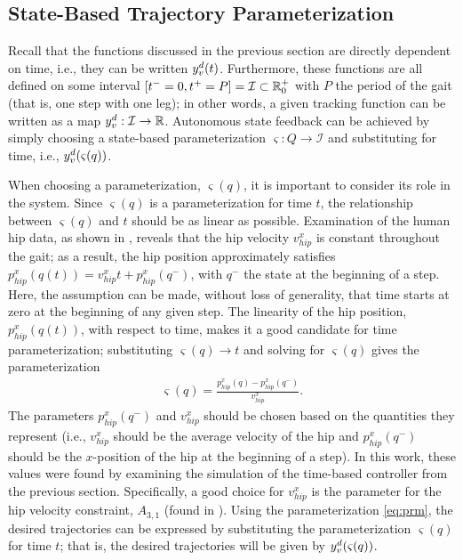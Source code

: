 \subsection{State-Based Trajectory Parameterization}

Recall that the functions discussed in the previous section are directly
dependent on time, i.e., they can be written $y_{v}^{d}(t)$.
%
Furthermore, these functions are all defined on some interval $[t^- = 0, t^+ =
P] = \mathcal{I} \subset \mathbb{R}_{0}^{+}$ with $P$ the period of the gait (that is,
one step with one leg);
%
in other words, a given tracking function can be written as a map $y_{v}^{d} :
\mathcal{I} \to \mathbb{R}$.
%
Autonomous state feedback can be achieved by simply choosing a state-based
parameterization $\varsigma : Q \to \mathcal{I}$ and substituting for time,
i.e., $y_{v}^{d}(\varsigma(q))$.

When choosing a parameterization, $\varsigma(q)$, it is important to consider
its role in the system.
%
Since $\varsigma(q)$ is a parameterization for time $t$, the relationship
between $\varsigma(q)$ and $t$ should be as linear as possible.
%
Examination of the human hip data, as shown in , reveals
that the hip velocity $v_{\mathit{hip}}^{x}$ is constant throughout the gait;
%
as a result, the hip position approximately satisfies
$p_{\mathit{hip}}^{x}(q(t)) = v_{\mathit{hip}}^x t + p_\mathit{hip}^x(q^-)$,
with $q^-$ the state at the beginning of a step.
%
Here, the assumption can be made, without loss of generality, that time starts
at zero at the beginning of any given step.
%
The linearity of the hip position, $p_{\mathit{hip}}^{x}(q(t))$, with respect to
time, makes it a good candidate for time parameterization;
%
substituting $\varsigma(q) \to t$ and solving for $\varsigma(q)$ gives the
parameterization
\begin{align}
  \label{eq:prm}
  \varsigma(q) = \frac{p_{\mathit{hip}}^{x}(q) -
    p_{\mathit{hip}}^{x}(q^-)}{v_{\mathit{hip}}^{x}}.
\end{align}
%
The parameters $p_{\mathit{hip}}^{x}(q^-)$ and $v_{\mathit{hip}}^{x}$ should be
chosen based on the quantities they represent (i.e., $v_{\mathit{hip}}^{x}$
should be the average velocity of the hip and $p_{\mathit{hip}}^{x}(q^-)$ should
be the $x$-position of the hip at the beginning of a step).
%
In this work, these values were found by examining the simulation of the
time-based controller from the previous section.
%
Specifically, a good choice for $v_{\mathit{hip}}^{x}$ is the parameter for the
hip velocity constraint, $A_{3,1}$ (found in ).
%
Using the parameterization \eqref{eq:prm}, the desired trajectories can be
expressed by substituting the parameterization $\varsigma(q)$ for time $t$;
%
that is, the desired trajectories will be given by $y_{v}^{d}(\varsigma(q))$.

